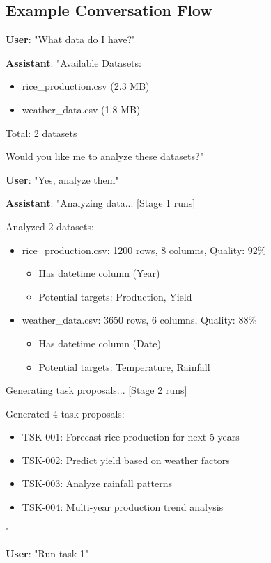 \documentclass[11pt,a4paper]{article}
\begin{document}
\subsection{Example Conversation Flow}

\textbf{User}: "What data do I have?"

\textbf{Assistant}: "Available Datasets:
\begin{itemize}
    \item rice\_production.csv (2.3 MB)
    \item weather\_data.csv (1.8 MB)
\end{itemize}
Total: 2 datasets

Would you like me to analyze these datasets?"

\textbf{User}: "Yes, analyze them"

\textbf{Assistant}: "Analyzing data... [Stage 1 runs]

Analyzed 2 datasets:
\begin{itemize}
    \item rice\_production.csv: 1200 rows, 8 columns, Quality: 92\%
    \begin{itemize}
        \item Has datetime column (Year)
        \item Potential targets: Production, Yield
    \end{itemize}
    \item weather\_data.csv: 3650 rows, 6 columns, Quality: 88\%
    \begin{itemize}
        \item Has datetime column (Date)
        \item Potential targets: Temperature, Rainfall
    \end{itemize}
\end{itemize}

Generating task proposals... [Stage 2 runs]

Generated 4 task proposals:
\begin{itemize}
    \item TSK-001: Forecast rice production for next 5 years
    \item TSK-002: Predict yield based on weather factors
    \item TSK-003: Analyze rainfall patterns
    \item TSK-004: Multi-year production trend analysis
\end{itemize}"

\textbf{User}: "Run task 1"
\end{document}
